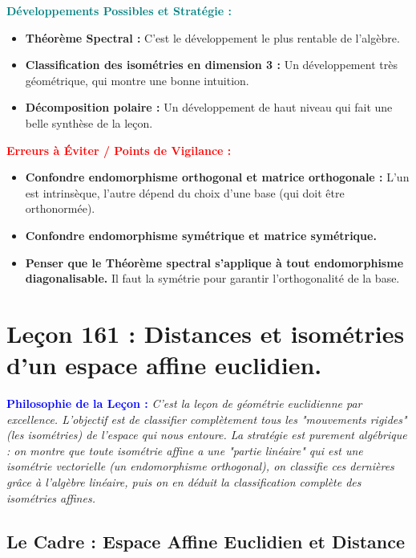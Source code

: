 \documentclass[12pt, a4paper, parskip=full]{report}
\theoremstyle{agregstyle}
\newenvironment{philosophie}
  {\par\medskip\noindent\begin{oframed}\noindent\textbf{\textcolor{blue}{Philosophie de la Leçon :}}\itshape}
  {\end{oframed}\par\medskip}
\newenvironment{developpements}
  {\par\medskip\noindent\begin{oframed}\noindent\textbf{\textcolor{teal}{Développements Possibles et Stratégie :}}}
  {\end{oframed}\par\medskip}
\newenvironment{erreurs}
  {\par\medskip\noindent\begin{oframed}\noindent\textbf{\textcolor{red}{Erreurs à Éviter / Points de Vigilance :}}}
  {\end{oframed}\par\medskip}
\begin{document}
\begin{developpements}
    \begin{itemize}
        \item \textbf{Théorème Spectral :} C'est le développement le plus rentable de l'algèbre.
        \item \textbf{Classification des isométries en dimension 3 :} Un développement très géométrique, qui montre une bonne intuition.
        \item \textbf{Décomposition polaire :} Un développement de haut niveau qui fait une belle synthèse de la leçon.
    \end{itemize}
\end{developpements}

\begin{erreurs}
    \begin{itemize}
        \item \textbf{Confondre endomorphisme orthogonal et matrice orthogonale :} L'un est intrinsèque, l'autre dépend du choix d'une base (qui doit être orthonormée).
        \item \textbf{Confondre endomorphisme symétrique et matrice symétrique.}
        \item \textbf{Penser que le Théorème spectral s'applique à tout endomorphisme diagonalisable.} Il faut la symétrie pour garantir l'orthogonalité de la base.
    \end{itemize}
\end{erreurs}

\newpage
\chapter{Leçon 161 : Distances et isométries d'un espace affine euclidien.}

\begin{philosophie}
    C'est la leçon de géométrie euclidienne par excellence. L'objectif est de classifier complètement tous les "mouvements rigides" (les isométries) de l'espace qui nous entoure. La stratégie est purement algébrique : on montre que toute isométrie affine a une "partie linéaire" qui est une isométrie vectorielle (un endomorphisme orthogonal), on classifie ces dernières grâce à l'algèbre linéaire, puis on en déduit la classification complète des isométries affines.
\end{philosophie}

\section{Le Cadre : Espace Affine Euclidien et Distance}
\end{document}
